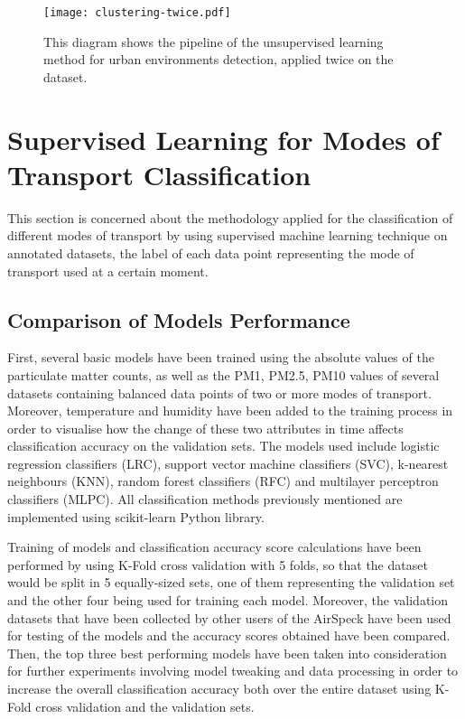 \documentclass[bsc,frontabs,twoside,singlespacing,parskip,deptreport]{infthesis}     %
\begin{document}
\begin{figure}[H]
  \center
  \texttt{[image: clustering-twice.pdf]}
  \caption{This diagram shows the pipeline of the unsupervised learning method for urban environments detection, applied twice on the dataset.}
  \label{fig:clustering-twice}
\end{figure}

\section{Supervised Learning for Modes of Transport Classification}

This section is concerned about the methodology applied for the classification of different modes of transport by using supervised machine learning technique on annotated datasets, the label of each data point representing the mode of transport used at a certain moment.

\subsection{Comparison of Models Performance}

First, several basic models have been trained using the absolute values of the particulate matter counts, as well as the PM1, PM2.5, PM10 values of several datasets containing balanced data points of two or more modes of transport. Moreover, temperature and humidity have been added to the training process in order to visualise how the change of these two attributes in time affects classification accuracy on the validation sets. The models used include logistic regression classifiers (LRC), support vector machine classifiers (SVC), k-nearest neighbours (KNN), random forest classifiers (RFC) and multilayer perceptron classifiers (MLPC). All classification methods previously mentioned are implemented using scikit-learn Python library.

Training of models and classification accuracy score calculations have been performed by using K-Fold cross validation with 5 folds, so that the dataset would be split in 5 equally-sized sets, one of them representing the validation set and the other four being used for training each model. Moreover, the validation datasets that have been collected by other users of the AirSpeck have been used for testing of the models and the accuracy scores obtained have been compared. Then, the top three best performing models have been taken into consideration for further experiments involving model tweaking and data processing in order to increase the overall classification accuracy both over the entire dataset using K-Fold cross validation and the validation sets.
\end{document}
